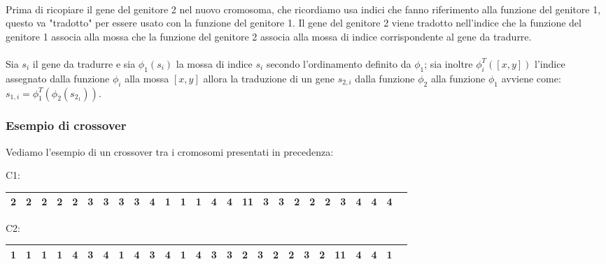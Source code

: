 \documentclass{article}
\begin{document}
\paragraph{}
Prima di ricopiare il gene del genitore 2 nel nuovo cromosoma, che ricordiamo usa indici che fanno riferimento alla funzione del genitore 1, questo va "tradotto" per essere usato con la funzione del genitore 1. Il gene del genitore 2 viene tradotto nell'indice che la funzione del genitore 1 associa alla mossa che la funzione del genitore 2 associa alla mossa di indice corrispondente al gene da tradurre.
\paragraph{}
Sia $s_i$ il gene da tradurre e sia $\phi_1(s_i)$ la mossa di indice $s_i$ secondo l'ordinamento definito da $\phi_1$; sia inoltre $\phi_i^T([x,y])$ l'indice assegnato dalla funzione $\phi_i$ alla mossa $[x,y]$ allora la traduzione di un gene $s_{2,i}$ dalla funzione $\phi_2$ alla funzione $\phi_1$ avviene come: $s_{1,i}=\phi_1^T(\phi_2(s_{2_1}))$.

\subsubsection{Esempio di crossover}
Vediamo l'esempio di un crossover tra i cromosomi presentati in precedenza:

\begin{center}
\begin{adjustbox}{width=\columnwidth,center}
   C1: \begin{tabular}{ | c | c | c | c | c | c | c | c| c | c | c | c | c | c | c | c| c | c | c | c | c | c | c | c | c | c | } 
  \hline
   2 & 2 & 2 & 2 & 2 & 3 & 3 &3&3&4&1&1&1&4&4&11&3&3&2&2&2&3&4&4&4\\
  \hline
\end{tabular}
\end{adjustbox}
\end{center}
\begin{center}
\begin{adjustbox}{width=\columnwidth,center}
   C2: \begin{tabular}{ | c | c | c | c | c | c | c | c| c | c | c | c | c | c | c | c| c | c | c | c | c | c | c | c | c | c | } 
  \hline
   1 & 1 & 1 & 1 & 4 & 3 & 4 & 1 & 4 & 3 & 4 & 1 & 4 & 3 & 3 & 2 & 3 & 2 & 2 & 3 & 2 & 11 & 4 & 4 & 1\\
  \hline
\end{tabular}
\end{adjustbox}
\end{center}
\end{document}
